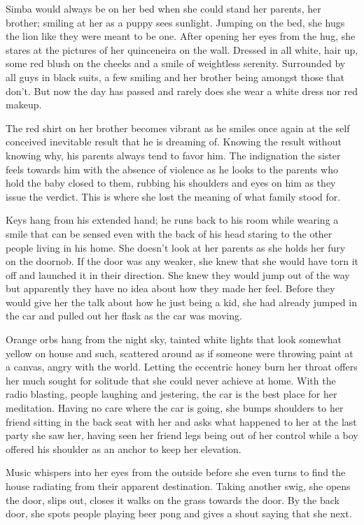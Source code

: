 \begin{Document}
        Simba would always be on her bed when she could stand her parents, her brother; smiling at her as a puppy sees sunlight. Jumping on the bed, she
    hugs the lion like they were meant to be one. After opening her eyes from the hug, she stares at the pictures of her quinceneira on the wall. Dressed
    in all white, hair up, some red blush on the cheeks and a smile of weightless serenity. Surrounded by all guys in black suits, a few smiling and her
    brother being amongst those that don't. But now the day has passed and rarely does she wear a white dress nor red makeup.

        The red shirt on her brother becomes vibrant as he smiles once again at the self conceived inevitable result that he is dreaming of. Knowing the
    result without knowing why, his parents always tend to favor him. The indignation the sister feels towards him with the absence of violence as he
    looks to the parents who hold the baby closed to them, rubbing his shoulders and eyes on him as they issue the verdict. This is where she lost the
    meaning of what family stood for.

        Keys hang from his extended hand; he runs back to his room while wearing a smile that can be sensed even with the back of his head staring to the
    other people living in his home. She doesn't look at her parents as she holds her fury on the doornob. If the door was any weaker, she knew that she
    would have torn it off and launched it in their direction. She knew they would jump out of the way but apparently they have no idea about how they
    made her feel. Before they would give her the talk about how he just being a kid, she had already jumped in the car and pulled out her flask as the
    car was moving.

       Orange orbs hang from the night sky, tainted white lights that look somewhat yellow on house and such, scattered around as if someone were throwing
    paint at a canvas, angry with the world. Letting the eccentric honey burn her throat offers her much sought for solitude that she could never achieve
    at home. With the radio blasting, people laughing and jestering, the car is the best place for her meditation. Having no care where the car is going,
    she bumps shoulders to her friend sitting in the back seat with her and asks what happened to her at the last party she saw her, having seen her
    friend legs being out of her control while a boy offered his shoulder as an anchor to keep her elevation.

        Music whispers into her eyes from the outside before she even turns to find the house radiating from their apparent destination. Taking another
    swig, she opens the door, slips out, closes it walks on the grass towards the door. By the back door, she spots people playing beer pong and gives
    a shout saying that she next. 
\end{Document}
